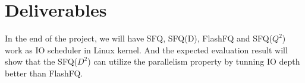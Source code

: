 \section{Deliverables}
In the end of the project, we will have SFQ, SFQ(D), FlashFQ and SFQ($Q^2$) work as IO scheduler in Linux kernel. And the expected evaluation result will show that the SFQ($D^2$) can utilize the parallelism property by tunning IO depth better than FlashFQ.